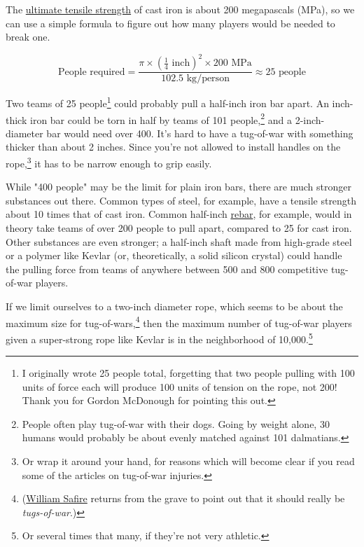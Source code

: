 {{The \href{https://en.wikipedia.org/wiki/Ultimate\_tensile\_strength}{ultimate tensile strength} of cast iron is about 200 megapascals (MPa), so we can use a simple formula to figure out how many players would be needed to break one.}

{\[\text{People required}=\frac{\pi\times\left(\tfrac{1}{4}\text{ inch}\right)^2\times200\text{ MPa}}{102.5\text{ kg}/\text{person}}\approx25\text{ people}\]}

{Two teams of 25 people{\footnote{I originally wrote 25 people total, forgetting that two people pulling with 100 units of force each will produce 100 units of tension on the rope, not 200! Thank you for Gordon McDonough for pointing this out.} } could probably pull a half-inch iron bar apart. An inch-thick iron bar could be torn in half by teams of 101 people,{\footnote{People often play tug-of-war with their dogs. Going by weight alone, 30 humans would probably be about evenly matched against 101 dalmatians.} } and a 2-inch-diameter bar would need over 400. It's hard to have a tug-of-war with something thicker than about 2 inches. Since you're not allowed to install handles on the rope,{\footnote{Or wrap it around your hand, for reasons which will become clear if you read some of the articles on tug-of-war injuries.} } it has to be narrow enough to grip easily.}

{While "400 people" may be the limit for plain iron bars, there are much stronger substances out there. Common types of steel, for example, have a tensile strength about 10 times that of cast iron. Common half-inch \href{https://en.wikipedia.org/wiki/Rebar}{rebar}, for example, would in theory take teams of over 200 people to pull apart, compared to 25 for cast iron. Other substances are even stronger; a half-inch shaft made from high-grade steel or a polymer like Kevlar (or, theoretically, a solid silicon crystal) could handle the pulling force from teams of anywhere between 500 and 800 competitive tug-of-war players.}

{If we limit ourselves to a two-inch diameter rope, which seems to be about the maximum size for tug-of-wars,{\footnote{(\href{http://www.theonion.com/articles/william-safire-orders-two-whoppers-junior,3351/}{William Safire} returns from the grave to point out that it should really be \emph{tugs-of-war}.)} } then the maximum number of tug-of-war players given a super-strong rope like Kevlar is in the neighborhood of 10,000.{\footnote{Or several times that many, if they're not very athletic.} } }

}
